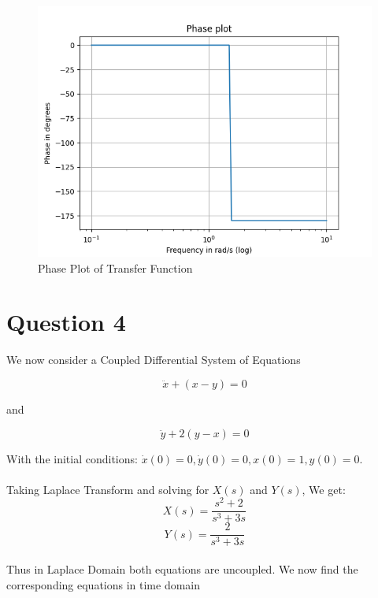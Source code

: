 \documentclass{article}
\begin{document}
\begin{figure}[tbh!]
    \centering
    \includegraphics[scale=0.6]{plots/Phase plot.png}
    \caption{Phase Plot of Transfer Function}
    \label{fig:Phase Plot 1}
\end{figure}


\section*{Question 4}\label{Question 4}

We now consider a Coupled Differential System of Equations

\begin{equation}
    \ddot x + (x-y) = 0
\end{equation}

and 

\begin{equation}
    \ddot y + 2(y-x) = 0
\end{equation}

\noindent
With the initial conditions: $\dot x(0) =0,\dot y(0) =0,x(0) =1,y(0) =0$.
\\ \\
\noindent
Taking Laplace Transform and solving for $X(s)$ and $Y(s)$, We get:
\begin{equation}
    X(s) = \frac{s^2+2}{s^3 + 3s}
\end{equation}
\begin{equation}
    Y(s) = \frac{2}{s^3 + 3s}
\end{equation}
\\
Thus in Laplace Domain both equations are uncoupled. We now find the corresponding equations in time domain
\end{document}
